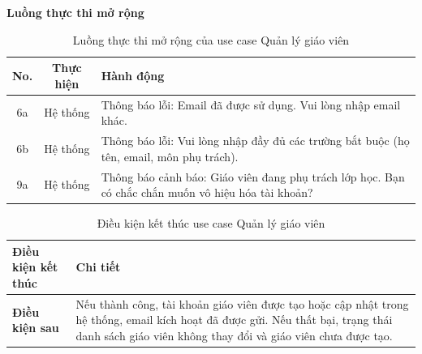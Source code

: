 ﻿\documentclass[../DoAn.tex]{subfiles}
\begin{document}
\noindent\textbf{Luồng thực thi mở rộng}
\begin{table}[H]
\centering
\begin{tabular}{|c|c|p{9cm}|}
\hline
\textbf{No.} & \textbf{Thực hiện} & \textbf{Hành động} \\ \hline
6a & Hệ thống & Thông báo lỗi: Email đã được sử dụng. Vui lòng nhập email khác. \\ \hline
6b & Hệ thống & Thông báo lỗi: Vui lòng nhập đầy đủ các trường bắt buộc (họ tên, email, môn phụ trách). \\ \hline
9a & Hệ thống & Thông báo cảnh báo: Giáo viên đang phụ trách lớp học. Bạn có chắc chắn muốn vô hiệu hóa tài khoản? \\ \hline
\end{tabular}
\caption{Luồng thực thi mở rộng của use case Quản lý giáo viên}
\label{table:2.3.1_ext}
\end{table}
\begin{table}[H]
\centering
\begin{tabular}{|p{4cm}|p{10cm}|}
\hline
\textbf{Điều kiện kết thúc} & \textbf{Chi tiết} \\ \hline
\textbf{Điều kiện sau} & Nếu thành công, tài khoản giáo viên được tạo hoặc cập nhật trong hệ thống, email kích hoạt đã được gửi. Nếu thất bại, trạng thái danh sách giáo viên không thay đổi và giáo viên chưa được tạo. \\ \hline
\end{tabular}
\caption{Điều kiện kết thúc use case Quản lý giáo viên}
\label{table:2.3.1_post}
\end{table}
\end{document}
